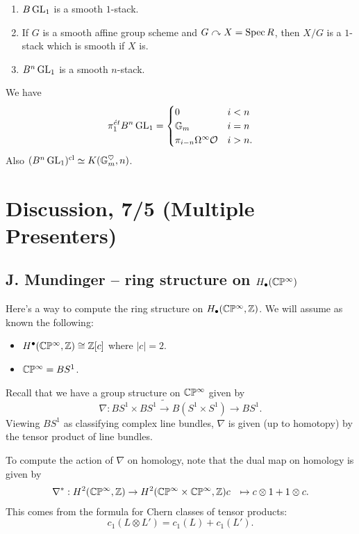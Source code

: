 \documentclass{amsart}
\begin{document}
\begin{ex}
	\begin{enumerate}
		\item $B\operatorname{GL}_1$ is a smooth $1$-stack.
		\item If $G$ is a smooth affine group scheme and $G \curvearrowright X = \operatorname{Spec} R$, then $X / G$ is a $1$-stack which is smooth if $X$ is.
		\item $B^n \operatorname{GL}_1$ is a smooth $n$-stack.
	\end{enumerate}
\end{ex}

\begin{rmk}
	We have
	\[
		\pi_1^{\acute{e}t} B^n \operatorname{GL}_1 = \begin{cases}
			0 & i < n \\
			\mathbb{G}_m & i = n \\
			\pi_{i-n} \Omega^\infty \mathcal{O} & i > n.
		\end{cases}
	\]
	Also $(B^n \operatorname{GL}_1)^{\mathrm{cl}} \simeq K(\mathbb{G}_m^\heartsuit, n)$.
\end{rmk}

\section*{Discussion, 7/5 (Multiple Presenters)}

\subsection{J. Mundinger -- ring structure on $H_\bullet(\mathbb{C}\mathbb{P}^\infty)$}

Here's a way to compute the ring structure on $H_\bullet(\mathbb{C}\mathbb{P}^\infty, \mathbb{Z})$.
We will assume as known the following:
\begin{itemize}
	\item $H^\bullet(\mathbb{C}\mathbb{P}^\infty, \mathbb{Z}) \cong \mathbb{Z}[c]$ where $|c| = 2$.
	\item $\mathbb{C}\mathbb{P}^\infty = BS^1$.
\end{itemize}

Recall that we have a group structure on $\mathbb{C}\mathbb{P}^\infty$ given by
\[
	\nabla: BS^1 \times BS^1 \tilde{\to} B(S^1 \times S^1) \to BS^1.
\]
Viewing $BS^1$ as classifying complex line bundles, $\nabla$ is given (up to homotopy) by the tensor product of line bundles.

To compute the action of $\nabla$ on homology, note that the dual map on homology is given by
\begin{align*}
	\nabla^*: H^2(\mathbb{C}\mathbb{P}^\infty, \mathbb{Z}) &\to H^2(\mathbb{C}\mathbb{P}^\infty \times \mathbb{C}\mathbb{P}^\infty, \mathbb{Z})
	c &\mapsto c \otimes 1 + 1 \otimes c.
\end{align*}
This comes from the formula for Chern classes of tensor products: 
\[
	c_1(L \otimes L') = c_1(L) + c_1(L').
\]
\end{document}
